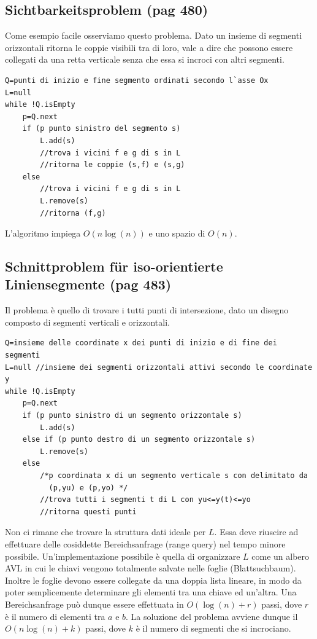 \documentclass[a4paper]{book}
\newcommand{\lstIndent}{4}
\begin{document}
\subsection{Sichtbarkeitsproblem (pag 480)}
Come esempio facile osserviamo questo problema. Dato un insieme di segmenti orizzontali ritorna le coppie visibili tra di loro, vale a dire che possono essere collegati da una retta verticale senza che essa si incroci con altri segmenti.
\begin{lstlisting}[tabsize=\lstIndent]
Q=punti di inizio e fine segmento ordinati secondo l`asse Ox
L=null
while !Q.isEmpty
	p=Q.next
	if (p punto sinistro del segmento s)
		L.add(s)
		//trova i vicini f e g di s in L
		//ritorna le coppie (s,f) e (s,g)
	else
		//trova i vicini f e g di s in L	
		L.remove(s)
		//ritorna (f,g)
\end{lstlisting}
L'algoritmo impiega $O(n \log (n))$ e uno spazio di $O(n)$.
\subsection{Schnittproblem für iso-orientierte Liniensegmente (pag 483)}
Il problema è quello di trovare i tutti punti di intersezione, dato un disegno composto di segmenti verticali e orizzontali.
\begin{lstlisting}[tabsize=\lstIndent]
Q=insieme delle coordinate x dei punti di inizio e di fine dei segmenti
L=null //insieme dei segmenti orizzontali attivi secondo le coordinate y
while !Q.isEmpty
	p=Q.next
	if (p punto sinistro di un segmento orizzontale s)
		L.add(s)
	else if (p punto destro di un segmento orizzontale s)
		L.remove(s)
	else 
		/*p coordinata x di un segmento verticale s con delimitato da
		  (p,yu) e (p,yo) */
		//trova tutti i segmenti t di L con yu<=y(t)<=yo
		//ritorna questi punti   		
\end{lstlisting}
Non ci rimane che trovare la struttura dati ideale per $L$. Essa deve riuscire ad effettuare delle cosiddette Bereichsanfrage (range query) nel tempo minore possibile. Un'implementazione possibile è quella di organizzare $L$ come un albero AVL in cui le chiavi vengono totalmente salvate nelle foglie (Blattsuchbaum). Inoltre le foglie devono essere collegate da una doppia lista lineare, in modo da poter semplicemente determinare gli elementi tra una chiave ed un'altra.
Una Bereichsanfrage può dunque essere effettuata in $O(\log (n)+r)$ passi, dove $r$ è il numero di elementi tra $a$ e $b$. La soluzione del problema avviene dunque il $O(n\log (n)+k)$ passi, dove $k$ è il numero di segmenti che si incrociano.
\end{document}
